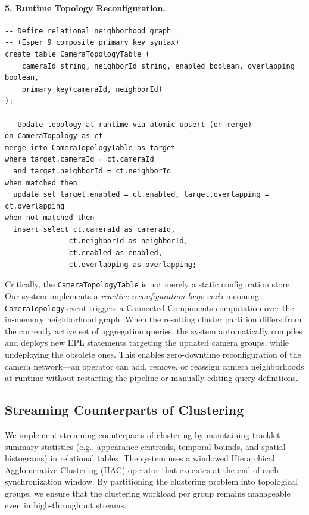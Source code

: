 \documentclass[11pt]{article}
\begin{document}
\paragraph{5. Runtime Topology Reconfiguration.}
\begin{verbatim}
-- Define relational neighborhood graph
-- (Esper 9 composite primary key syntax)
create table CameraTopologyTable (
    cameraId string, neighborId string, enabled boolean, overlapping boolean,
    primary key(cameraId, neighborId)
);

-- Update topology at runtime via atomic upsert (on-merge)
on CameraTopology as ct
merge into CameraTopologyTable as target
where target.cameraId = ct.cameraId
  and target.neighborId = ct.neighborId
when matched then
  update set target.enabled = ct.enabled, target.overlapping = ct.overlapping
when not matched then
  insert select ct.cameraId as cameraId,
               ct.neighborId as neighborId,
               ct.enabled as enabled,
               ct.overlapping as overlapping;
\end{verbatim}

\noindent Critically, the \texttt{CameraTopologyTable} is not merely a static configuration store. Our system implements a \emph{reactive reconfiguration loop}: each incoming \texttt{CameraTopology} event triggers a Connected Components computation over the in-memory neighborhood graph. When the resulting cluster partition differs from the currently active set of aggregation queries, the system automatically compiles and deploys new EPL statements targeting the updated camera groups, while undeploying the obsolete ones. This enables zero-downtime reconfiguration of the camera network---an operator can add, remove, or reassign camera neighborhoods at runtime without restarting the pipeline or manually editing query definitions.


\subsection{Streaming Counterparts of Clustering}
We implement streaming counterparts of clustering by maintaining tracklet summary statistics (e.g., appearance centroids, temporal bounds, and spatial histograms) in relational tables. The system uses a windowed Hierarchical Agglomerative Clustering (HAC) operator that executes at the end of each synchronization window. By partitioning the clustering problem into topological groups, we ensure that the clustering workload per group remains manageable even in high-throughput streams.
\end{document}
